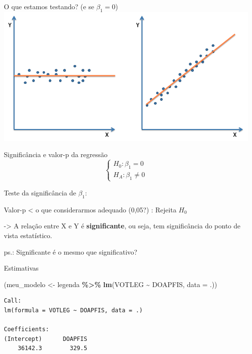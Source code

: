 \documentclass[
  9pt,
  ignorenonframetext,
  aspectratio=169]{beamer}
\newenvironment{Shaded}{\begin{snugshade}}{\end{snugshade}}
\newcommand{\DataTypeTok}[1]{\textcolor[rgb]{0.13,0.29,0.53}{#1}}
\newcommand{\KeywordTok}[1]{\textcolor[rgb]{0.13,0.29,0.53}{\textbf{#1}}}
\newcommand{\NormalTok}[1]{#1}
\newcommand{\OperatorTok}[1]{\textcolor[rgb]{0.81,0.36,0.00}{\textbf{#1}}}
\newcommand{\StringTok}[1]{\textcolor[rgb]{0.31,0.60,0.02}{#1}}
\begin{document}
\begin{frame}{O que estamos testando? (e se \(\beta_1=0\))}
\protect\hypertarget{o-que-estamos-testando-e-se-beta_10}{}
\includegraphics{imgs/beta1.png}
\end{frame}

\begin{frame}{Significância e valor-p da regressão}
\protect\hypertarget{significuxe2ncia-e-valor-p-da-regressuxe3o}{}
\[
\left\{\begin{array}{l}
H_{0}: \beta_{1}=0 \\
H_{A}: \beta_{1} \neq 0
\end{array}\right.
\]

Teste da significância de \(\beta_{1}\):

Valor-p \textless{} o que considerarmos adequado (0,05?) : Rejeita
\(H_{0}\)

-\textgreater{} A relação entre X e Y é \textbf{significante}, ou seja,
tem significância do ponto de vista estatístico.

ps.: Significante é o mesmo que significativo?
\end{frame}

\begin{frame}[fragile]{Estimativas}
\protect\hypertarget{estimativas}{}
\begin{Shaded}
\begin{Highlighting}[]
\NormalTok{(meu\_modelo \textless{}{-}}\StringTok{ }\NormalTok{legenda }\OperatorTok{\%\textgreater{}\%}\StringTok{ }\KeywordTok{lm}\NormalTok{(VOTLEG }\OperatorTok{\textasciitilde{}}\StringTok{ }\NormalTok{DOAPFIS, }\DataTypeTok{data =}\NormalTok{ .))}
\end{Highlighting}
\end{Shaded}

\begin{verbatim}
Call:
lm(formula = VOTLEG ~ DOAPFIS, data = .)

Coefficients:
(Intercept)      DOAPFIS  
    36142.3        329.5  
\end{verbatim}
\end{frame}
\end{document}
